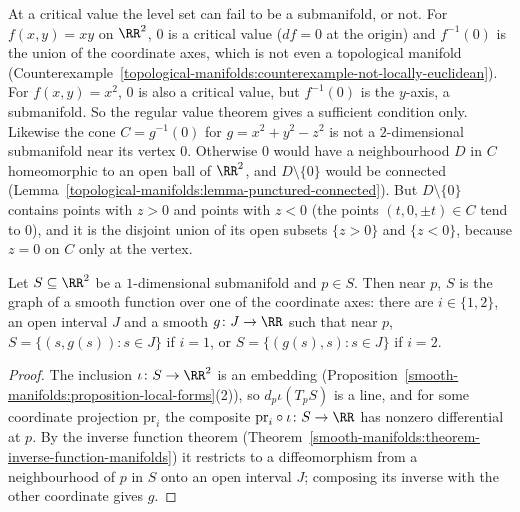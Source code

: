 \begin{counterexample}\label{smooth-manifolds:counterexample-critical-level}
At a critical value the level set can fail to be a submanifold, or not. For $f(x, y) = xy$ on $\RR^2$, $0$ is a critical value ($df = 0$ at the origin) and $f^{-1}(0)$ is the union of the coordinate axes, which is not even a
topological manifold (Counterexample~\ref{topological-manifolds:counterexample-not-locally-euclidean}). For $f(x, y) = x^2$, $0$ is also a critical value, but $f^{-1}(0)$ is the $y$-axis, a submanifold. So the regular value
theorem gives a sufficient condition only. Likewise the cone $C = g^{-1}(0)$ for $g = x^2 + y^2 - z^2$ is not a $2$-dimensional submanifold near its vertex
$0$. Otherwise $0$ would have a neighbourhood $D$ in $C$ homeomorphic to an open ball of $\RR^2$, and $D \setminus \{0\}$ would be connected
(Lemma~\ref{topological-manifolds:lemma-punctured-connected}). But $D \setminus \{0\}$ contains points with $z > 0$ and points with $z < 0$ (the points
$(t, 0, \pm t) \in C$ tend to $0$), and it is the disjoint union of its open subsets $\{z > 0\}$ and $\{z < 0\}$, because $z = 0$ on $C$ only at the vertex.
\end{counterexample}

\begin{lemma}\label{smooth-manifolds:lemma-curve-graph}
Let $S \subseteq \RR^2$ be a $1$-dimensional submanifold and $p \in S$. Then near $p$, $S$ is the graph of a smooth function over one of the coordinate axes: there are $i \in \{1, 2\}$, an open interval $J$ and a smooth
$g \colon J \to \RR$ such that near $p$, $S = \{(s, g(s)) : s \in J\}$ if $i = 1$, or $S = \{(g(s), s) : s \in J\}$ if $i = 2$.
\end{lemma}

\begin{proof}
The inclusion $\iota \colon S \to \RR^2$ is an embedding (Proposition~\ref{smooth-manifolds:proposition-local-forms}(2)), so $d_p\iota(T_pS)$ is a line, and for some coordinate projection $\mathrm{pr}_i$ the composite
$\mathrm{pr}_i \circ \iota \colon S \to \RR$ has nonzero differential at $p$. By the inverse function theorem (Theorem~\ref{smooth-manifolds:theorem-inverse-function-manifolds}) it restricts to a diffeomorphism from a
neighbourhood of $p$ in $S$ onto an open interval $J$; composing its inverse with the other coordinate gives $g$.
\end{proof}

